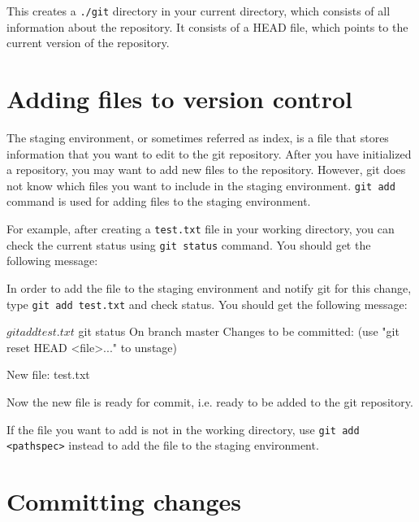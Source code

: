 \documentclass[12pt]{report}
\newcommand\code[1]{{\color{blue}\texttt{#1}}}
\begin{document}
\bigskip
\noindent
This creates a \code{./git} directory in your current directory, which consists of all information about the repository. It consists of a HEAD file, which points to the current version of the repository.


\section{Adding files to version control}

The staging environment, or sometimes referred as index, is a file that stores information that you want to edit to the git repository. After you have initialized a repository, you may want to add new files to the repository. However, git does not know which files you want to include in the staging environment. \code{git add} command is used for adding files to the staging environment.

For example, after creating a \texttt{test.txt} file in your working directory, you can check the current status using \code{git status} command. You should get the following message:


In order to add the file to the staging environment and notify git for this change, type \code{git add test.txt} and check status. You should get the following message:

\begin{blockcode}
$ git add test.txt
$ git status
On branch master
Changes to be committed:
  (use "git reset HEAD <file>..." to unstage)
  
    New file: test.txt

\end{blockcode}

Now the new file is ready for commit, i.e. ready to be added to the git repository.

If the file you want to add is not in the working directory, use \code{git add <pathspec>} instead to add the file to the staging environment.

\section{Committing changes}
\end{document}
